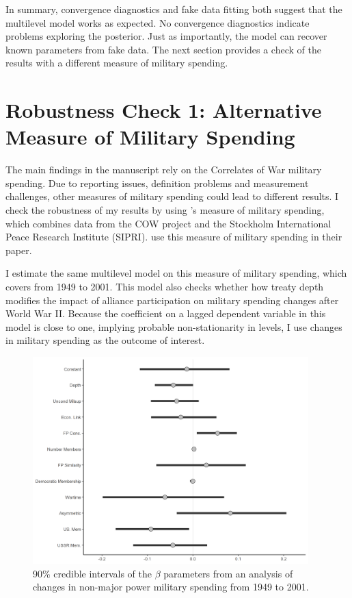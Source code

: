 \documentclass[12pt]{article}
\begin{document}
In summary, convergence diagnostics and fake data fitting both suggest that the multilevel model works as expected. 
No convergence diagnostics indicate problems exploring the posterior. 
Just as importantly, the model can recover known parameters from fake data. 
The next section provides a check of the results with a different measure of military spending. 




\section{Robustness Check 1: Alternative Measure of Military Spending}

The main findings in the manuscript rely on the Correlates of War military spending. 
Due to reporting issues, definition problems and measurement challenges, other measures of military spending could lead to different results. 
I check the robustness of my results by using \citet{Nordhausetal2012}'s measure of military spending, which combines data from the COW project and the Stockholm International Peace Research Institute (SIPRI). 
\citet{DigiuseppePoast2016} use this measure of military spending in their paper. 


I estimate the same multilevel model on this measure of military spending, which covers from 1949 to 2001. 
This model also checks whether how treaty depth modifies the impact of alliance participation on military spending changes after World War II.
Because the coefficient on a lagged dependent variable in this model is close to one, implying probable non-stationarity in levels, I use changes in military spending as the outcome of interest. 


\begin{figure}[htbp]
	\centering
		\includegraphics[width=0.95\textwidth]{post45-beta-res.png}
	\caption{90\% credible intervals of the $\beta$ parameters from an analysis of changes in non-major power military spending from 1949 to 2001.}
	\label{fig:post45-beta-res}
\end{figure}
\end{document}
